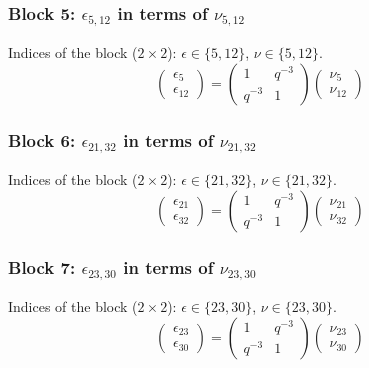 \subsubsection{Block 5: $\epsilon_{5, 12}$ in terms of $\nu_{5, 12}$}
Indices of the block ($2\times 2$): $\epsilon \in \{5, 12\}$, $\nu \in \{5, 12\}$.
\[
\begin{pmatrix}
\epsilon_{5} \\
\epsilon_{12}
\end{pmatrix}
=
\begin{pmatrix}
1 & q^{-3} \\
q^{-3} & 1
\end{pmatrix}
\begin{pmatrix}
\nu_{5} \\
\nu_{12}
\end{pmatrix}
\]

\subsubsection{Block 6: $\epsilon_{21, 32}$ in terms of $\nu_{21, 32}$}
Indices of the block ($2\times 2$): $\epsilon \in \{21, 32\}$, $\nu \in \{21, 32\}$.
\[
\begin{pmatrix}
\epsilon_{21} \\
\epsilon_{32}
\end{pmatrix}
=
\begin{pmatrix}
1 & q^{-3} \\
q^{-3} & 1
\end{pmatrix}
\begin{pmatrix}
\nu_{21} \\
\nu_{32}
\end{pmatrix}
\]

\subsubsection{Block 7: $\epsilon_{23, 30}$ in terms of $\nu_{23, 30}$}
Indices of the block ($2\times 2$): $\epsilon \in \{23, 30\}$, $\nu \in \{23, 30\}$.
\[
\begin{pmatrix}
\epsilon_{23} \\
\epsilon_{30}
\end{pmatrix}
=
\begin{pmatrix}
1 & q^{-3} \\
q^{-3} & 1
\end{pmatrix}
\begin{pmatrix}
\nu_{23} \\
\nu_{30}
\end{pmatrix}
\]

